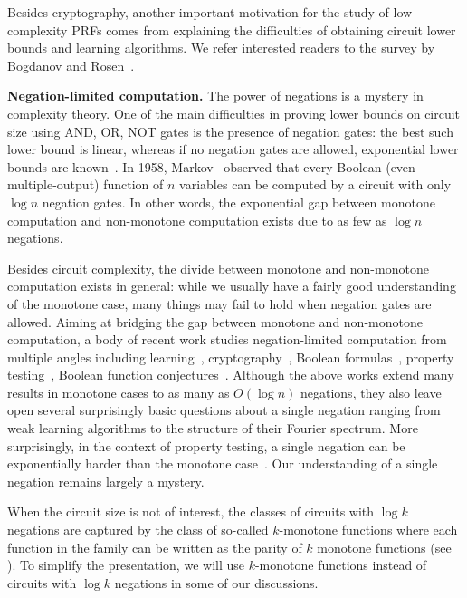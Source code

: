\documentclass{toc}
\begin{document}
Besides cryptography, another important motivation for the study of low complexity PRFs comes from explaining the difficulties of obtaining circuit lower bounds and learning algorithms. We refer interested readers to the survey by Bogdanov and Rosen~\cite{BR17}. 


\vspace{2ex}
%
\noindent\textbf{Negation-limited computation.} %
The power of negations is a mystery in complexity theory. One of the main difficulties in proving lower bounds on circuit size using AND, OR, NOT gates is the presence of negation gates: the best such lower bound is linear, whereas if no negation gates are allowed, exponential lower bounds are known~\cite{razborov1985lower,andreev1985method,alon1987monotone,tardos1988gap,berg1999symmetric,harnik2000higher}. In 1958, Markov~\cite{Mark} observed that every Boolean (even multiple-output) function of $n$ variables can be computed by a circuit with only $\log{n}$ negation gates.  In other words, the 
%
%
exponential gap between monotone computation and non-monotone computation exists due to as few as $\log{n}$ negations.

Besides circuit complexity, the divide between monotone and non-monotone computation exists in general:  while we usually have a fairly good understanding of the monotone case, many things may fail to hold when negation gates are allowed. Aiming at bridging the gap between monotone and non-monotone computation, a body of recent work studies negation-limited computation from multiple angles including learning~\cite{BCOST15}, cryptography~\cite{GMOR15}, Boolean formulas~\cite{GK15,Ros15}, property testing~\cite{CGGKW17,GKW19}, Boolean function conjectures~\cite{LZ17}. Although the above works extend many results in monotone cases to as many as $O(\log n)$ negations, they also leave open several surprisingly basic questions about a single negation ranging from weak learning algorithms to the structure of their Fourier spectrum. More surprisingly, in the context of property testing, a single negation can be exponentially harder than the monotone case~\cite{CGGKW17,GKW19}.  Our understanding of a single negation remains largely a mystery.

When the circuit size is not of interest, the classes of circuits with $\log k$ negations are captured by the class of so-called $k$-monotone functions where each function in the family can be written as the parity of $k$ monotone
%
functions (see  %
). To simplify the presentation, we will use $k$-monotone functions instead of circuits with $\log{k}$ negations in some of our discussions.
\end{document}
